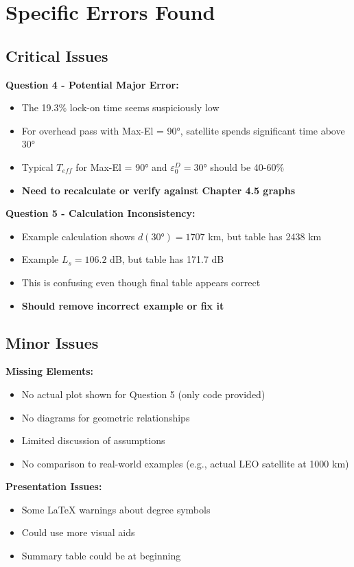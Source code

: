 \documentclass[11pt,letterpaper]{article}
\begin{document}
\section{Specific Errors Found}

\subsection{Critical Issues}

\textbf{Question 4 - Potential Major Error:}
\begin{itemize}
    \item The 19.3\% lock-on time seems suspiciously low
    \item For overhead pass with Max-El = 90°, satellite spends significant time above 30°
    \item Typical $T_{eff}$ for Max-El = 90° and $\varepsilon_0^D = 30°$ should be 40-60\%
    \item \textbf{Need to recalculate or verify against Chapter 4.5 graphs}
\end{itemize}

\textbf{Question 5 - Calculation Inconsistency:}
\begin{itemize}
    \item Example calculation shows $d(30°) = 1707$ km, but table has 2438 km
    \item Example $L_s = 106.2$ dB, but table has 171.7 dB
    \item This is confusing even though final table appears correct
    \item \textbf{Should remove incorrect example or fix it}
\end{itemize}

\subsection{Minor Issues}

\textbf{Missing Elements:}
\begin{itemize}
    \item No actual plot shown for Question 5 (only code provided)
    \item No diagrams for geometric relationships
    \item Limited discussion of assumptions
    \item No comparison to real-world examples (e.g., actual LEO satellite at 1000 km)
\end{itemize}

\textbf{Presentation Issues:}
\begin{itemize}
    \item Some LaTeX warnings about degree symbols
    \item Could use more visual aids
    \item Summary table could be at beginning
\end{itemize}
\end{document}
